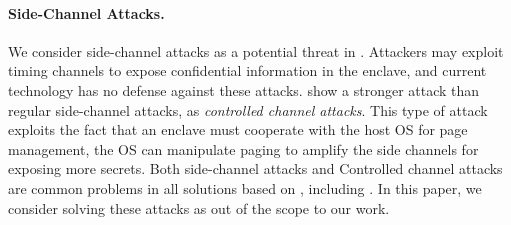 \paragraph{Side-Channel Attacks.}
We consider side-channel attacks as a potential threat in \sysname{}.
Attackers may exploit timing channels to expose confidential
information in the enclave, and current \sgx{} technology has no defense
against these attacks.
\cite{xu15controlledchannel} show a stronger attack than regular side-channel attacks, as {\em controlled channel attacks}.
This type of attack exploits the fact that an enclave must cooperate
with the host OS for page management,
the OS can manipulate paging to amplify the side channels
for exposing more secrets.
Both side-channel attacks and Controlled channel attacks
are common problems in all solutions based on \sgx{},
including \haven{}. In this paper, we consider solving these attacks as
out of the scope to our work.




